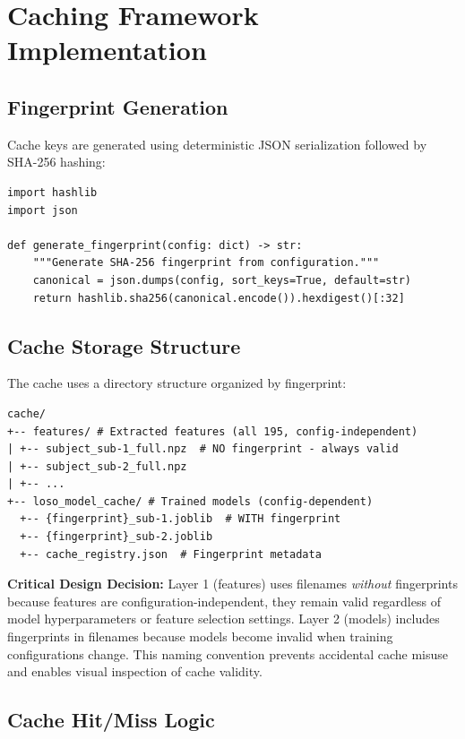 \documentclass{imc-inf} %
\begin{document}
\section{Caching Framework Implementation}
\label{sec:caching}

\subsection{Fingerprint Generation}

Cache keys are generated using deterministic JSON serialization followed by SHA-256 hashing:

\begin{verbatim}
import hashlib
import json

def generate_fingerprint(config: dict) -> str:
    """Generate SHA-256 fingerprint from configuration."""
    canonical = json.dumps(config, sort_keys=True, default=str)
    return hashlib.sha256(canonical.encode()).hexdigest()[:32]
\end{verbatim}

\subsection{Cache Storage Structure}

The cache uses a directory structure organized by fingerprint:

\begin{verbatim}
cache/
+-- features/ # Extracted features (all 195, config-independent)
| +-- subject_sub-1_full.npz  # NO fingerprint - always valid
| +-- subject_sub-2_full.npz
| +-- ...
+-- loso_model_cache/ # Trained models (config-dependent)
  +-- {fingerprint}_sub-1.joblib  # WITH fingerprint
  +-- {fingerprint}_sub-2.joblib
  +-- cache_registry.json  # Fingerprint metadata
\end{verbatim}

\textbf{Critical Design Decision:} Layer 1 (features) uses filenames 
\textit{without} fingerprints because features are configuration-independent, they 
remain valid regardless of model hyperparameters or feature selection settings. 
Layer 2 (models) includes fingerprints in filenames because models become invalid 
when training configurations change. This naming convention prevents accidental 
cache misuse and enables visual inspection of cache validity.

\subsection{Cache Hit/Miss Logic}
\end{document}
